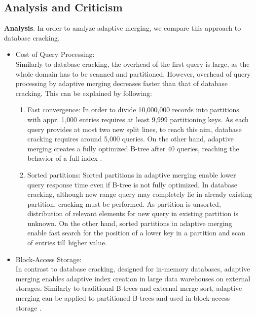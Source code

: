 \documentclass[10pt, conference, compsocconf]{IEEEtran}
\begin{document}
\subsection{Analysis and Criticism}
\label{subsec:merging_analysis}
\textbf{Analysis}. In order to analyze adaptive merging, we compare this approach to database cracking.\\
\begin{itemize}
\item{Cost of Query Processing:} \\Similarly to database cracking, the overhead of the first query is large, as the whole domain has to be scanned and partitioned. However, overhead of query processing by adaptive merging decreases faster than that of database cracking. This can be explained by following:\\
\begin{enumerate}
\item{Fast convergence}: In order to divide 10,000,000 records into partitions with appr. 1,000 entries requires at least 9,999 partitioning keys. As each query provides at most two new split lines, to reach this aim, database cracking requires around 5,000 queries. On the other hand, adaptive merging creates a fully optimized B-tree after 40 queries, reaching the behavior of a full index \cite{merging}.
\item{Sorted partitions}: Sorted partitions in adaptive merging enable lower query response time even if B-tree is not fully optimized. In database cracking, although new range query may completely lie in already existing partition, cracking must be performed. As partition is unsorted, distribution of relevant elements for new query in existing partition is unknown. On the other hand, sorted partitions in adaptive merging enable fast search for the position of a lower key in a partition and scan of entries till higher value.\\
\end{enumerate}
\item{Block-Access Storage:} \\ In contrast to database cracking, designed for in-memory databases, adaptive merging enables adaptive index creation in large data warehouses on external storages. Similarly to traditional B-trees and external merge sort, adaptive merging can be applied to partitioned B-trees and used in block-access storage \cite{merging}. \\
\end{itemize}
\end{document}

